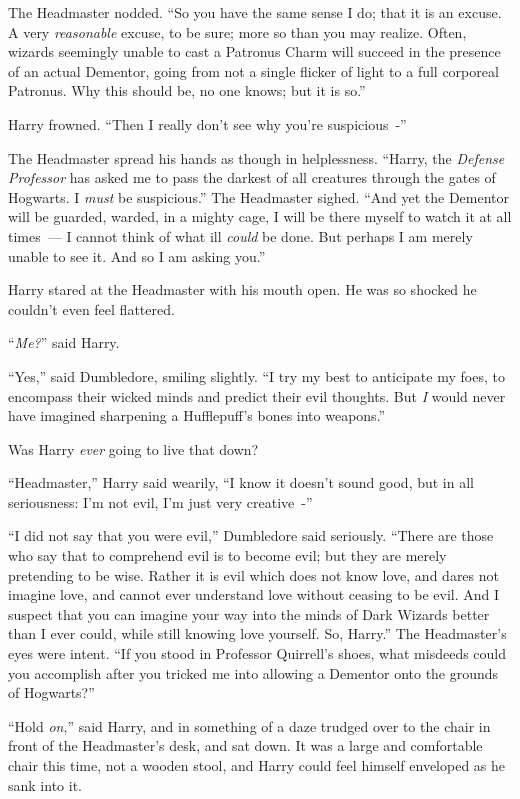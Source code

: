 The Headmaster nodded. ``So you have the same sense I do; that it is an excuse. A very \emph{reasonable} excuse, to be sure; more so than you may realize. Often, wizards seemingly unable to cast a Patronus Charm will succeed in the presence of an actual Dementor, going from not a single flicker of light to a full corporeal Patronus. Why this should be, no one knows; but it is so.''

Harry frowned. ``Then I really don't see why you're suspicious~-''

The Headmaster spread his hands as though in helplessness. ``Harry, the \emph{Defense Professor} has asked me to pass the darkest of all creatures through the gates of Hogwarts. I \emph{must} be suspicious.'' The Headmaster sighed. ``And yet the Dementor will be guarded, warded, in a mighty cage, I will be there myself to watch it at all times~--- I cannot think of what ill \emph{could} be done. But perhaps I am merely unable to see it. And so I am asking you.''

Harry stared at the Headmaster with his mouth open. He was so shocked he couldn't even feel flattered.

``\emph{Me?}'' said Harry.

``Yes,'' said Dumbledore, smiling slightly. ``I try my best to anticipate my foes, to encompass their wicked minds and predict their evil thoughts. But \emph{I} would never have imagined sharpening a Hufflepuff's bones into weapons.''

Was Harry \emph{ever} going to live that down?

``Headmaster,'' Harry said wearily, ``I know it doesn't sound good, but in all seriousness: I'm not evil, I'm just very creative~-''

``I did not say that you were evil,'' Dumbledore said seriously. ``There are those who say that to comprehend evil is to become evil; but they are merely pretending to be wise. Rather it is evil which does not know love, and dares not imagine love, and cannot ever understand love without ceasing to be evil. And I suspect that you can imagine your way into the minds of Dark Wizards better than I ever could, while still knowing love yourself. So, Harry.'' The Headmaster's eyes were intent. ``If you stood in Professor Quirrell's shoes, what misdeeds could you accomplish after you tricked me into allowing a Dementor onto the grounds of Hogwarts?''

``Hold \emph{on},'' said Harry, and in something of a daze trudged over to the chair in front of the Headmaster's desk, and sat down. It was a large and comfortable chair this time, not a wooden stool, and Harry could feel himself enveloped as he sank into it.

